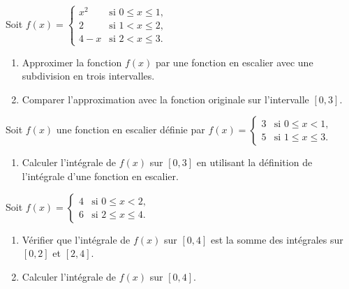 \begin{exercice}
Soit \( f(x) = \begin{cases}
x^2 & \text{si } 0 \leq x \leq 1, \\
2 & \text{si } 1 < x \leq 2, \\
4 - x & \text{si } 2 < x \leq 3.
\end{cases} \)
\begin{enumerate}
    \item Approximer la fonction \( f(x) \) par une fonction en escalier avec une subdivision en trois intervalles.
    \item Comparer l'approximation avec la fonction originale sur l'intervalle \( [0, 3] \).
\end{enumerate}
\end{exercice}

\begin{exercice}
Soit \( f(x) \) une fonction en escalier définie par \( f(x) = \begin{cases}
3 & \text{si } 0 \leq x < 1, \\
5 & \text{si } 1 \leq x \leq 3.
\end{cases} \)
\begin{enumerate}
    \item Calculer l'intégrale de \( f(x) \) sur \( [0, 3] \) en utilisant la définition de l'intégrale d'une fonction en escalier.
\end{enumerate}
\end{exercice}

\begin{exercice}
Soit \( f(x) = \begin{cases}
4 & \text{si } 0 \leq x < 2, \\
6 & \text{si } 2 \leq x \leq 4.
\end{cases} \)
\begin{enumerate}
    \item Vérifier que l'intégrale de \( f(x) \) sur \( [0, 4] \) est la somme des intégrales sur \( [0, 2] \) et \( [2, 4] \).
    \item Calculer l'intégrale de \( f(x) \) sur \( [0, 4] \).
\end{enumerate}
\end{exercice}

